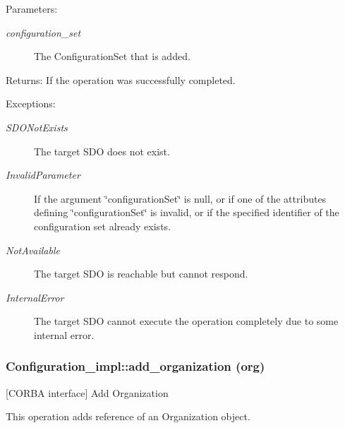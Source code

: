 \begin{Desc}
\item[Parameters:]
\begin{description}
\item[{\em configuration\_\-set}]The Configuration\-Set that is added. \end{description}
\end{Desc}
\begin{Desc}
\item[Returns:]If the operation was successfully completed. \end{Desc}
\begin{Desc}
\item[Exceptions:]
\begin{description}
\item[{\em SDONot\-Exists}]The target SDO does not exist. \item[{\em Invalid\-Parameter}]If the argument \char`\"{}configuration\-Set\char`\"{} is null, or if one of the attributes defining \char`\"{}configuration\-Set\char`\"{} is invalid, or if the specified identifier of the configuration set already exists. \item[{\em Not\-Available}]The target SDO is reachable but cannot respond. \item[{\em Internal\-Error}]The target SDO cannot execute the operation completely due to some internal error.\end{description}
\end{Desc}
\subsubsection{\setlength{\rightskip}{0pt plus 5cm}Configuration\_\-impl::add\_\-organization (org)}\label{classConfiguration__impl_Configuration__impla3}


[CORBA interface] Add Organization 

This operation adds reference of an Organization object.


